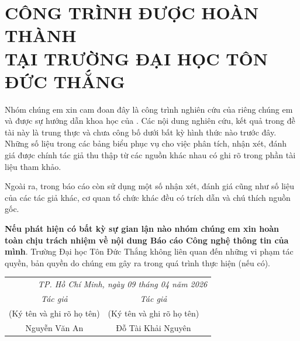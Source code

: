 \section*{ CÔNG TRÌNH ĐƯỢC HOÀN THÀNH\\TẠI TRƯỜNG ĐẠI HỌC TÔN ĐỨC THẮNG}

	Nhóm chúng em xin cam đoan đây là công trình nghiên cứu của riêng chúng em và được sự hướng dẫn khoa học của \hl{\mbox{\gvhd}}. Các nội dung nghiên cứu, kết quả trong đề tài này là trung thực và chưa công bố dưới bất kỳ hình thức nào trước đây. Những số liệu trong các bảng biểu phục vụ cho việc phân tích, nhận xét, đánh giá được chính tác giả thu thập từ các nguồn khác nhau có ghi rõ trong phần tài liệu tham khảo.
 
	Ngoài ra, trong báo cáo còn sử dụng một số nhận xét, đánh giá cũng như số liệu của các tác giả khác, cơ quan tổ chức khác đều có trích dẫn và chú thích nguồn gốc.
 
	\textbf{Nếu phát hiện có bất kỳ sự gian lận nào nhóm chúng em xin hoàn toàn chịu trách nhiệm về nội dung Báo cáo Công nghệ thông tin của mình}. Trường Đại học Tôn Đức Thắng không liên quan đến những vi phạm tác quyền, bản quyền do chúng em gây ra trong quá trình thực hiện (nếu có).
    
\begin{flushright}
    \begin{tabular}{ccc}
        \multicolumn{3}{r}{\textit{TP. Hồ Chí Minh, ngày 09 tháng 04 năm 2026}} \\
        \noalign{\vspace{0.5cm}} %
         \textit{Tác giả} & \textit{Tác giả} \\
        (Ký tên và ghi rõ họ tên) & (Ký tên và ghi rõ họ tên) \\
        \noalign{\vspace{2cm}}
        Nguyễn Văn An & Đỗ Tài Khải Nguyên  \\
    \end{tabular}
    \end{flushright}
\newpage
